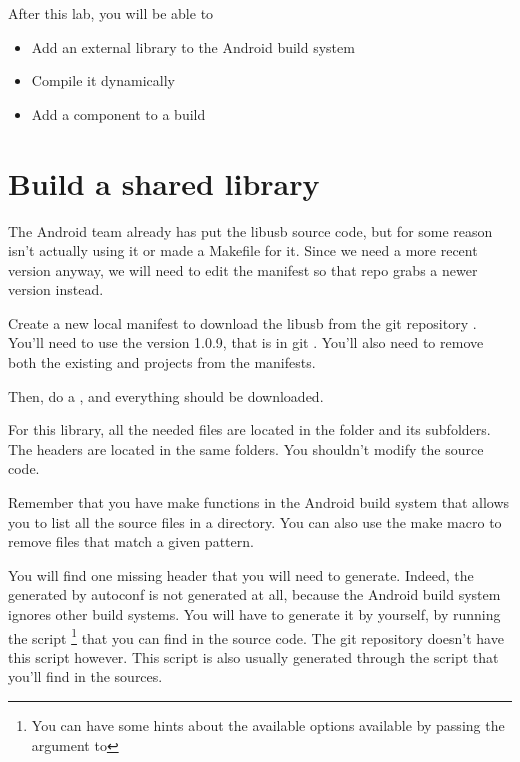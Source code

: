 
After this lab, you will be able to
\begin{itemize}
  \item Add an external library to the Android build system
  \item Compile it dynamically
  \item Add a component to a build
\end{itemize}

\section{Build a shared library}

The Android team already has put the libusb source code, but for some
reason isn't actually using it or made a Makefile for it. Since we
need a more recent version anyway, we will need to edit the manifest
so that repo grabs a newer version instead.

Create a new local manifest to download the libusb from the git
repository . You'll need to use the
version 1.0.9, that is in git . You'll also need
to remove both the existing  and 
projects from the manifests.

Then, do a , and everything should be downloaded.

For this library, all the needed  files are located in the
 folder and its subfolders. The headers are located in
the same folders. You shouldn't modify the  source code.

Remember that you have make functions in the Android build system that
allows you to list all the source files in a directory. You can also
use the  make macro to remove files that match a
given pattern.

You will find one missing header that you will need to
generate. Indeed, the  generated by autoconf is not
generated at all, because the Android build system ignores other build
systems. You will have to generate it by yourself, by running the
 script \footnote{You can have some hints about the
  available options available by passing the  argument to
  } that you can find in the  source
code. The git repository doesn't have this  script
however. This script is also usually generated through the
 script that you'll find in the sources.

